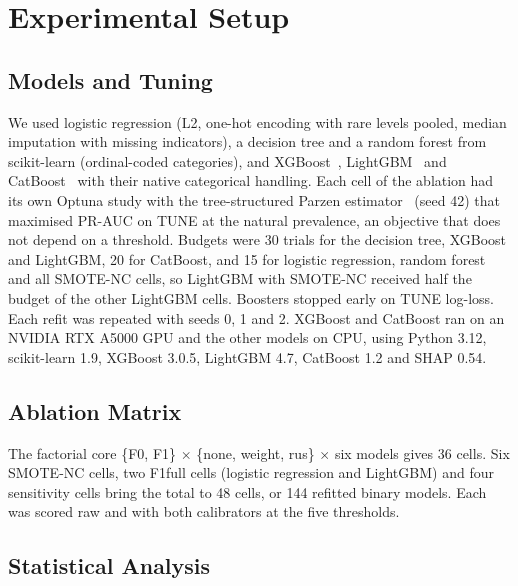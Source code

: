 \documentclass[conference,letterpaper]{IEEEtran}
\begin{document}
\section{Experimental Setup}

\subsection{Models and Tuning}

We used logistic regression (L2, one-hot encoding with rare levels pooled, median imputation with missing indicators), a decision tree and a random forest from scikit-learn (ordinal-coded categories), and XGBoost~\cite{chen2016xgboost}, LightGBM~\cite{ke2017lightgbm} and CatBoost~\cite{prokhorenkova2018catboost} with their native categorical handling. Each cell of the ablation had its own Optuna study with the tree-structured Parzen estimator~\cite{akiba2019optuna} (seed 42) that maximised PR-AUC on TUNE at the natural prevalence, an objective that does not depend on a threshold. Budgets were 30 trials for the decision tree, XGBoost and LightGBM, 20 for CatBoost, and 15 for logistic regression, random forest and all SMOTE-NC cells, so LightGBM with SMOTE-NC received half the budget of the other LightGBM cells. Boosters stopped early on TUNE log-loss. Each refit was repeated with seeds 0, 1 and 2. XGBoost and CatBoost ran on an NVIDIA RTX A5000 GPU and the other models on CPU, using Python 3.12, scikit-learn 1.9, XGBoost 3.0.5, LightGBM 4.7, CatBoost 1.2 and SHAP 0.54.

\subsection{Ablation Matrix}

The factorial core \{F0, F1\} $\times$ \{none, weight, rus\} $\times$ six models gives 36 cells. Six SMOTE-NC cells, two F1full cells (logistic regression and LightGBM) and four sensitivity cells bring the total to 48 cells, or 144 refitted binary models. Each was scored raw and with both calibrators at the five thresholds.

\subsection{Statistical Analysis}
\end{document}

